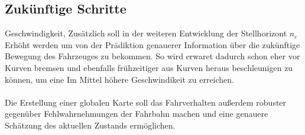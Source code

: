 \subsection{Zukünftige Schritte}
Geschwindigkeit, Zusätzlich soll in der weiteren Entwicklung der Stellhorizont $n_c$ Erhöht werden um von der Prädiktion genauerer Information über die zukünftige Bewegung des Fahrzeuges zu bekommen. So wird erwaret dadurch schon eher vor Kurven bremsen und ebenfalls frühzeitiger aus Kurven heraus beschleunigen zu können, um eine Im Mittel höhere Geschwindikeit zu erreichen.\\ \\ Die Erstellung einer globalen Karte soll das Fahrverhalten außerdem robuster gegenüber Fehlwahrnehmungen der Fahrbahn machen und eine genauere Schätzung des aktuellen Zustands ermöglichen.